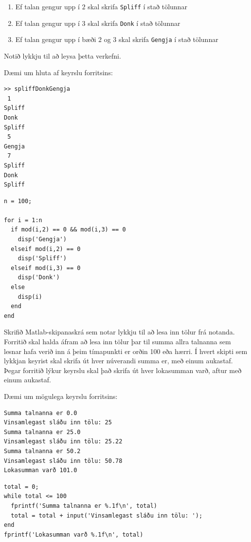 \documentclass[addpoints]{exam}
\begin{document}
\begin{questions}
\begin{enumerate}
 \item Ef talan gengur upp í $2$ skal skrifa \texttt{Spliff} í stað tölunnar
 \item Ef talan gengur upp í $3$ skal skrifa \texttt{Donk} í stað tölunnar
 \item Ef talan gengur upp í bæði $2$ og $3$ skal skrifa \texttt{Gengja} í stað tölunnar
\end{enumerate}
Notið lykkju til að leysa þetta verkefni.

Dæmi um hluta af keyrslu forritsins:
\begin{verbatim}
>> spliffDonkGengja
 1
Spliff
Donk
Spliff
 5
Gengja
 7
Spliff
Donk
Spliff
\end{verbatim}


\begin{solution}
\begin{verbatim}
n = 100;

for i = 1:n
  if mod(i,2) == 0 && mod(i,3) == 0
    disp('Gengja')
  elseif mod(i,2) == 0 
    disp('Spliff')
  elseif mod(i,3) == 0
    disp('Donk')
  else
    disp(i)  
  end
end
\end{verbatim}

\end{solution}

\newpage
\question[10]
Skrifið Matlab-skipanaskrá sem notar lykkju til að lesa inn tölur frá notanda. Forritið skal halda áfram að lesa inn tölur þar til summa allra talnanna sem lesnar hafa verið inn á þeim tímapunkti er orðin 100 eða hærri. Í hvert skipti sem lykkjan keyrist skal skrifa út hver núverandi summa er, með einum aukastaf. Þegar forritið lýkur keyrslu skal það skrifa út hver lokasumman varð, aftur með einum aukastaf.

Dæmi um mögulega keyrslu forritsins:

\begin{verbatim}
Summa talnanna er 0.0
Vinsamlegast sláðu inn tölu: 25
Summa talnanna er 25.0
Vinsamlegast sláðu inn tölu: 25.22
Summa talnanna er 50.2
Vinsamlegast sláðu inn tölu: 50.78
Lokasumman varð 101.0
\end{verbatim}

\vspace*{6cm}

\begin{solution}

\begin{verbatim}
total = 0;
while total <= 100
  fprintf('Summa talnanna er %.1f\n', total)
  total = total + input('Vinsamlegast sláðu inn tölu: ');
end
fprintf('Lokasumman varð %.1f\n', total)
\end{verbatim}
\end{solution}


\end{questions}
\end{document}
